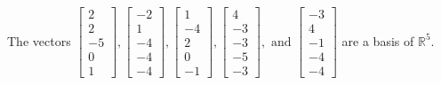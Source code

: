 \begin{exercise}
\begin{exerciseStatement}
  \end{exerciseStatement}
  \begin{exerciseAnswer}
   The vectors \(\left[\begin{array}{r}
2 \\
2 \\
-5 \\
0 \\
1
\end{array}\right] , \left[\begin{array}{r}
-2 \\
1 \\
-4 \\
-4 \\
-4
\end{array}\right] , \left[\begin{array}{r}
1 \\
-4 \\
2 \\
0 \\
-1
\end{array}\right] , \left[\begin{array}{r}
4 \\
-3 \\
-3 \\
-5 \\
-3
\end{array}\right] , \text{ and } \left[\begin{array}{r}
-3 \\
4 \\
-1 \\
-4 \\
-4
\end{array}\right]\) 
  	 are  a basis of \(\mathbb{R}^5\).
  


  \end{exerciseAnswer}
\end{exercise}